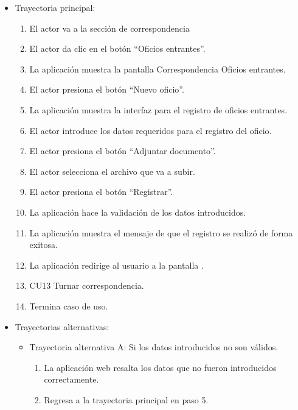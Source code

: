 \begin{itemize}
	\item Trayectoria principal:
	\begin{enumerate}
		\item	El actor va a la sección de correspondencia 
\item	El actor da clic en el botón “Oficios entrantes”.
\item	La aplicación muestra la pantalla  Correspondencia Oficios entrantes.
\item	El actor presiona el botón “Nuevo oficio”.
\item	La aplicación muestra la interfaz  para el registro de oficios entrantes.
\item	El actor introduce los datos requeridos para el registro del oficio.
\item	El actor presiona el botón “Adjuntar documento”.
\item	El actor selecciona el archivo que va a subir.
\item	El actor presiona el botón “Registrar”.
\item	La aplicación hace la validación de los datos introducidos.
\item	La aplicación muestra el mensaje  de que el registro se realizó de forma exitosa.
\item	La aplicación redirige al usuario a la pantalla .
\item	CU13 Turnar correspondencia.
\item	Termina caso de uso.

	\end{enumerate}
	
	\item Trayectorias alternativas:
	\begin{itemize}
		\item Trayectoria alternativa A: Si los datos introducidos no son válidos.
			\begin{enumerate}
				\item La aplicación web resalta los datos que no fueron introducidos correctamente. 
				\item Regresa a la trayectoria principal en paso 5.
			\end{enumerate}
	\end{itemize}
\end{itemize}

